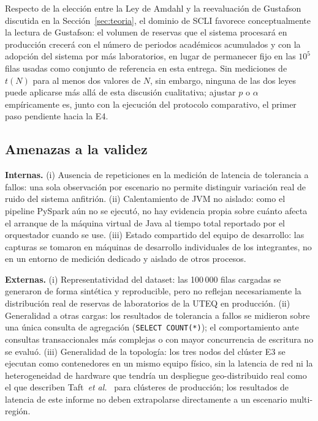 \documentclass[10pt,twocolumn]{article}
\begin{document}
Respecto de la elección entre la Ley de Amdahl y la reevaluación de
Gustafson discutida en la Sección~\ref{sec:teoria}, el dominio de SCLI
favorece conceptualmente la lectura de Gustafson: el volumen de reservas
que el sistema procesará en producción crecerá con el número de periodos
académicos acumulados y con la adopción del sistema por más laboratorios,
en lugar de permanecer fijo en las $10^5$ filas usadas como conjunto de
referencia en esta entrega. Sin mediciones de $t(N)$ para al menos dos
valores de $N$, sin embargo, ninguna de las dos leyes puede aplicarse más
allá de esta discusión cualitativa; ajustar $p$ o $\alpha$ empíricamente
es, junto con la ejecución del protocolo comparativo, el primer paso
pendiente hacia la E4.

\subsection{Amenazas a la validez}

\textbf{Internas.} (i) Ausencia de repeticiones en la medición de latencia
de tolerancia a fallos: una sola observación por escenario no permite
distinguir variación real de ruido del sistema anfitrión. (ii) Calentamiento
de JVM no aislado: como el pipeline PySpark aún no se ejecutó, no hay
evidencia propia sobre cuánto afecta el arranque de la máquina virtual de
Java al tiempo total reportado por el orquestador cuando se use. (iii)
Estado compartido del equipo de desarrollo: las capturas se tomaron en
máquinas de desarrollo individuales de los integrantes, no en un entorno de
medición dedicado y aislado de otros procesos.

\textbf{Externas.} (i) Representatividad del dataset: las 100\,000 filas
cargadas se generaron de forma sintética y reproducible, pero no reflejan
necesariamente la distribución real de reservas de laboratorios de la UTEQ
en producción. (ii) Generalidad a otras cargas: los resultados de
tolerancia a fallos se midieron sobre una única consulta de agregación
(\texttt{SELECT COUNT(*)}); el comportamiento ante consultas transaccionales
más complejas o con mayor concurrencia de escritura no se evaluó. (iii)
Generalidad de la topología: los tres nodos del clúster E3 se ejecutan como
contenedores en un mismo equipo físico, sin la latencia de red ni la
heterogeneidad de hardware que tendría un despliegue geo-distribuido real
como el que describen Taft~\emph{et al.}~\cite{taft2020} para clústeres de
producción; los resultados de latencia de este informe no deben
extrapolarse directamente a un escenario multi-región.
\end{document}
